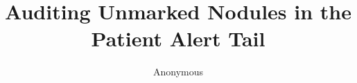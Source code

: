 \documentclass[10pt,twocolumn,letterpaper]{article}
\title{Auditing Unmarked Nodules in the Patient Alert Tail}
\author{Anonymous}
\begin{document}

{
    \small
    
    
}
\end{document}
